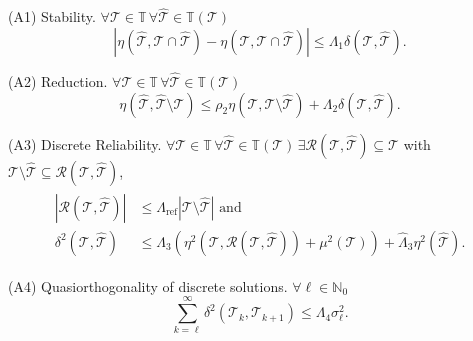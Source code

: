 \documentclass{siamltex1213}
\begin{document}
\begin{axioms}
\item[(A1)]Stability. $\forall {\mathcal{T}} \in {\mathbb T} \, \forall {\hat{\mathcal{T}}} \in {\mathbb T\left({\mathcal{T}}\right)}$
	\begin{equation}\label{eq:A1}\tag{A1}
		{\left\lvert {\eta({\hat{\mathcal{T}}},{\mathcal{T}} \cap {\hat{\mathcal{T}}}) - \eta({\mathcal{T}},{\mathcal{T}} \cap {\hat{\mathcal{T}}})} \right\rvert} \leq {\ensuremath{\Lambda_{\mathrm{1}}}} \delta({\mathcal{T}},{\hat{\mathcal{T}}}).
	\end{equation}
\item[(A2)] Reduction. $\forall {\mathcal{T}} \in {\mathbb T}\, \forall {\hat{\mathcal{T}}} \in {\mathbb T\left({\mathcal{T}}\right)}$
	\begin{equation}\label{eq:A2}\tag{A2}
		\eta({\hat{\mathcal{T}}}, {\hat{\mathcal{T}}} \setminus {\mathcal{T}}) \leq \rho_{2}\eta({\mathcal{T}}, {\mathcal{T}} \setminus {\hat{\mathcal{T}}}) + {\ensuremath{\Lambda_{\mathrm{2}}}} \delta({\mathcal{T}},{\hat{\mathcal{T}}}).
	\end{equation}
\item[(A3)] Discrete Reliability.
	$\forall {\mathcal{T}} \in {\mathbb T} \,\forall {\hat{\mathcal{T}}} \in {\mathbb T\left({\mathcal{T}}\right)}\, \exists \mathcal R({\mathcal{T}}, {\hat{\mathcal{T}}}) \subseteq {\mathcal{T}}$ with ${\mathcal{T}} \setminus {\hat{\mathcal{T}}} \subseteq \mathcal R({\mathcal{T}}, {\hat{\mathcal{T}}})$,
	\begin{align}\label{eq:A3}\tag{A3}
		\begin{aligned}
		{\left\lvert { \mathcal R({\mathcal{T}}, {\hat{\mathcal{T}}})} \right\rvert} &\leq {\ensuremath{\Lambda_{\mathrm{ref}}}} {\left\lvert {{\mathcal{T}} \setminus {\hat{\mathcal{T}}}} \right\rvert} \text{ and }\\
		\delta^2({\mathcal{T}}, {\hat{\mathcal{T}}}) &\leq {\ensuremath{\Lambda_{\mathrm{3}}}} \left( \eta^2({\mathcal{T}},\mathcal R({\mathcal{T}},{\hat{\mathcal{T}}})) + \mu^2({\mathcal{T}}) \right) + 
		{\ensuremath{\widehat{\Lambda}_{\mathrm{3}}}} \eta^2({\hat{\mathcal{T}}}). 
	\end{aligned}
	\end{align}
\item[(A4)] Quasiorthogonality of discrete solutions.
	$\forall \ell \in {\mathbb{N}_0}$
		\begin{equation}\label{eq:A4}
			\sum_{k=\ell}^{\infty} \delta^2({\mathcal T_{k}}, {\mathcal T_{{k+1}}})
			\leq {\ensuremath{\Lambda_{\mathrm{4}}}} \sigma_{\ell}^2.\tag{A4}
		\end{equation}
		\end{axioms}
\end{document}

